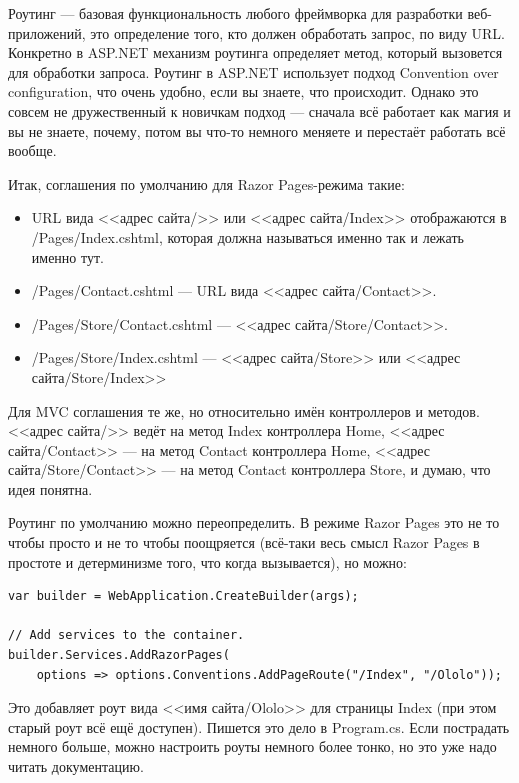 \documentclass[a5paper]{article}
\begin{document}
Роутинг --- базовая функциональность любого фреймворка для разработки веб-приложений, это определение того, кто должен обработать запрос, по виду URL. Конкретно в ASP.NET механизм роутинга определяет метод, который вызовется для обработки запроса. Роутинг в ASP.NET использует подход Convention over configuration, что очень удобно, если вы знаете, что происходит. Однако это совсем не дружественный к новичкам подход --- сначала всё работает как магия и вы не знаете, почему, потом вы что-то немного меняете и перестаёт работать всё вообще.

Итак, соглашения по умолчанию для Razor Pages-режима такие:

\begin{itemize}
    \item URL вида <<адрес сайта/>> или <<адрес сайта/Index>> отображаются в /Pages/Index.cshtml, которая должна называться именно так и лежать именно тут.
    \item /Pages/Contact.cshtml --- URL вида <<адрес сайта/Contact>>.
    \item /Pages/Store/Contact.cshtml --- <<адрес сайта/Store/Contact>>.
    \item /Pages/Store/Index.cshtml --- <<адрес сайта/Store>> или <<адрес сайта/Store/Index>>
\end{itemize}

Для MVC соглашения те же, но относительно имён контроллеров и методов. <<адрес сайта/>> ведёт на метод Index контроллера Home, <<адрес сайта/Contact>> --- на метод Contact контроллера Home, <<адрес сайта/Store/Contact>> --- на метод Contact контроллера Store, и думаю, что идея понятна.

Роутинг по умолчанию можно переопределить. В режиме Razor Pages это не то чтобы просто и не то чтобы поощряется (всё-таки весь смысл Razor Pages в простоте и детерминизме того, что когда вызывается), но можно:

\begin{verbatim}
var builder = WebApplication.CreateBuilder(args);

// Add services to the container.
builder.Services.AddRazorPages(
    options => options.Conventions.AddPageRoute("/Index", "/Ololo"));
\end{verbatim}

Это добавляет роут вида <<имя сайта/Ololo>> для страницы Index (при этом старый роут всё ещё доступен). Пишется это дело в Program.cs. Если пострадать немного больше, можно настроить роуты немного более тонко, но это уже надо читать документацию.
\end{document}
